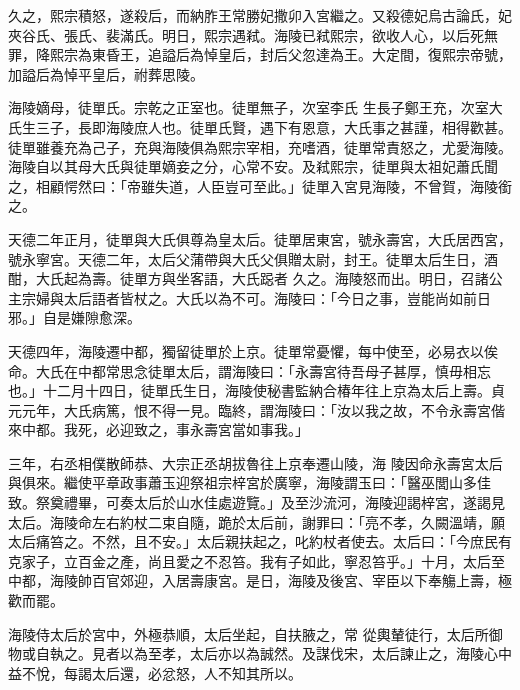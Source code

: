 \begin{pinyinscope}
 久之，熙宗積怒，遂殺后，而納胙王常勝妃撒卯入宮繼之。又殺德妃烏古論氏，妃夾谷氏、張氏、裴滿氏。明日，熙宗遇弒。海陵已弒熙宗，欲收人心，以后死無罪，降熙宗為東昏王，追謚后為悼皇后，封后父忽達為王。大定間，復熙宗帝號，加謚后為悼平皇后，祔葬思陵。



 海陵嫡母，徒單氏。宗乾之正室也。徒單無子，次室李氏
 生長子鄭王充，次室大氏生三子，長即海陵庶人也。徒單氏賢，遇下有恩意，大氏事之甚謹，相得歡甚。徒單雖養充為己子，充與海陵俱為熙宗宰相，充嗜酒，徒單常責怒之，尤愛海陵。海陵自以其母大氏與徒單嫡妾之分，心常不安。及弒熙宗，徒單與太祖妃蕭氏聞之，相顧愕然曰：「帝雖失道，人臣豈可至此。」徒單入宮見海陵，不曾賀，海陵銜之。



 天德二年正月，徒單與大氏俱尊為皇太后。徒單居東宮，號永壽宮，大氏居西宮，號永寧宮。天德二年，太后父蒲帶與大氏父俱贈太尉，封王。徒單太后生日，酒酣，大氏起為壽。徒單方與坐客語，大氏跽者
 久之。海陵怒而出。明日，召諸公主宗婦與太后語者皆杖之。大氏以為不可。海陵曰：「今日之事，豈能尚如前日邪。」自是嫌隙愈深。



 天德四年，海陵遷中都，獨留徒單於上京。徒單常憂懼，每中使至，必易衣以俟命。大氏在中都常思念徒單太后，謂海陵曰：「永壽宮待吾母子甚厚，慎毋相忘也。」十二月十四日，徒單氏生日，海陵使秘書監納合椿年往上京為太后上壽。貞元元年，大氏病篤，恨不得一見。臨終，謂海陵曰：「汝以我之故，不令永壽宮偕來中都。我死，必迎致之，事永壽宮當如事我。」



 三年，右丞相僕散師恭、大宗正丞胡拔魯往上京奉遷山陵，海
 陵因命永壽宮太后與俱來。繼使平章政事蕭玉迎祭祖宗梓宮於廣寧，海陵謂玉曰：「醫巫閭山多佳致。祭奠禮畢，可奏太后於山水佳處遊覽。」及至沙流河，海陵迎謁梓宮，遂謁見太后。海陵命左右約杖二束自隨，跪於太后前，謝罪曰：「亮不孝，久闕溫靖，願太后痛笞之。不然，且不安。」太后親扶起之，叱約杖者使去。太后曰：「今庶民有克家子，立百金之產，尚且愛之不忍笞。我有子如此，寧忍笞乎。」十月，太后至中都，海陵帥百官郊迎，入居壽康宮。是日，海陵及後宮、宰臣以下奉觴上壽，極歡而罷。



 海陵侍太后於宮中，外極恭順，太后坐起，自扶腋之，常
 從輿輦徒行，太后所御物或自執之。見者以為至孝，太后亦以為誠然。及謀伐宋，太后諫止之，海陵心中益不悅，每謁太后還，必忿怒，人不知其所以。




\end{pinyinscope}

